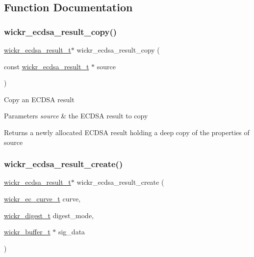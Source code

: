 \subsection{Function Documentation}
\mbox{\label{group__wickr__ecdsa__result_ga8664bbdec0bc8b354b3cb35704c42f57}} 
\subsubsection{\texorpdfstring{wickr\+\_\+ecdsa\+\_\+result\+\_\+copy()}{wickr\_ecdsa\_result\_copy()}}
{\footnotesize\ttfamily \hyperlink{structwickr__ecdsa__result}{wickr\+\_\+ecdsa\+\_\+result\+\_\+t}$\ast$ wickr\+\_\+ecdsa\+\_\+result\+\_\+copy (\begin{DoxyParamCaption}\item[{const \hyperlink{structwickr__ecdsa__result}{wickr\+\_\+ecdsa\+\_\+result\+\_\+t} $\ast$}]{source }\end{DoxyParamCaption})}

Copy an E\+C\+D\+SA result


\begin{DoxyParams}{Parameters}
{\em source} & the E\+C\+D\+SA result to copy \\
\hline
\end{DoxyParams}
\begin{DoxyReturn}{Returns}
a newly allocated E\+C\+D\+SA result holding a deep copy of the properties of \textquotesingle{}source\textquotesingle{} 
\end{DoxyReturn}
\mbox{\label{group__wickr__ecdsa__result_ga7e199a7c851fd07fb93180fb3a242749}} 
\subsubsection{\texorpdfstring{wickr\+\_\+ecdsa\+\_\+result\+\_\+create()}{wickr\_ecdsa\_result\_create()}}
{\footnotesize\ttfamily \hyperlink{structwickr__ecdsa__result}{wickr\+\_\+ecdsa\+\_\+result\+\_\+t}$\ast$ wickr\+\_\+ecdsa\+\_\+result\+\_\+create (\begin{DoxyParamCaption}\item[{\hyperlink{structwickr__ec__curve}{wickr\+\_\+ec\+\_\+curve\+\_\+t}}]{curve,  }\item[{\hyperlink{structwickr__digest}{wickr\+\_\+digest\+\_\+t}}]{digest\+\_\+mode,  }\item[{\hyperlink{structwickr__buffer}{wickr\+\_\+buffer\+\_\+t} $\ast$}]{sig\+\_\+data }\end{DoxyParamCaption})}

